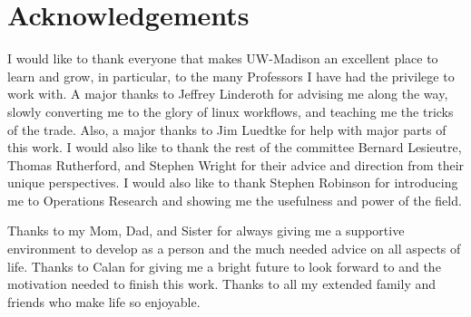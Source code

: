 
\section*{Acknowledgements}

I would like to thank everyone that makes UW-Madison an excellent place to learn and grow, in particular, to the many Professors I have had the privilege to work with.  A major thanks to Jeffrey Linderoth for advising me along the way, slowly converting me to the glory of linux workflows, and teaching me the tricks of the trade.  Also, a major thanks to Jim Luedtke for help with major parts of this work.  I would also like to thank the rest of the committee Bernard Lesieutre, Thomas Rutherford, and Stephen Wright for their advice and direction from their unique perspectives.  I would also like to thank Stephen Robinson for introducing me to Operations Research and showing me the usefulness and power of the field.

Thanks to my Mom, Dad, and Sister for always giving me a supportive environment to develop as a person and the much needed advice on all aspects of life. Thanks to Calan for giving me a bright future to look forward to and the motivation needed to finish this work.  Thanks to all my extended family and friends who make life so enjoyable.  

